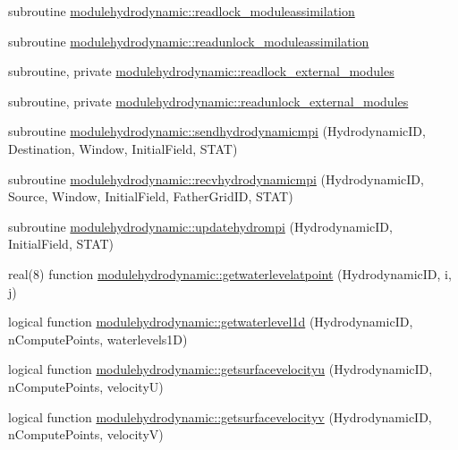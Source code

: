 \begin{DoxyCompactItemize}
\item 
subroutine \mbox{\hyperlink{namespacemodulehydrodynamic_ab5bfdd9c743fefaf135fd907892e5f17}{modulehydrodynamic\+::readlock\+\_\+moduleassimilation}}
\item 
subroutine \mbox{\hyperlink{namespacemodulehydrodynamic_a758de1858d333cb26621ded54ff8be04}{modulehydrodynamic\+::readunlock\+\_\+moduleassimilation}}
\item 
subroutine, private \mbox{\hyperlink{namespacemodulehydrodynamic_a52fe0c61446c7eca188bf5a42867951b}{modulehydrodynamic\+::readlock\+\_\+external\+\_\+modules}}
\item 
subroutine, private \mbox{\hyperlink{namespacemodulehydrodynamic_a6bb278dc4ab8e6429e5d7e752bd6347a}{modulehydrodynamic\+::readunlock\+\_\+external\+\_\+modules}}
\item 
subroutine \mbox{\hyperlink{namespacemodulehydrodynamic_a81c72f539c0330e132af0d9586b8a1b4}{modulehydrodynamic\+::sendhydrodynamicmpi}} (Hydrodynamic\+ID, Destination, Window, Initial\+Field, S\+T\+AT)
\item 
subroutine \mbox{\hyperlink{namespacemodulehydrodynamic_a7093ab7e0b48d35daf4c523567c57d5a}{modulehydrodynamic\+::recvhydrodynamicmpi}} (Hydrodynamic\+ID, Source, Window, Initial\+Field, Father\+Grid\+ID, S\+T\+AT)
\item 
subroutine \mbox{\hyperlink{namespacemodulehydrodynamic_a0b6a544e894ede118ad20bf00d80fa39}{modulehydrodynamic\+::updatehydrompi}} (Hydrodynamic\+ID, Initial\+Field, S\+T\+AT)
\item 
real(8) function \mbox{\hyperlink{namespacemodulehydrodynamic_aed5f042412115b2fc0605a45374090fc}{modulehydrodynamic\+::getwaterlevelatpoint}} (Hydrodynamic\+ID, i, j)
\item 
logical function \mbox{\hyperlink{namespacemodulehydrodynamic_a904ffc2601f0d353ef41686c0912a17d}{modulehydrodynamic\+::getwaterlevel1d}} (Hydrodynamic\+ID, n\+Compute\+Points, waterlevels1D)
\item 
logical function \mbox{\hyperlink{namespacemodulehydrodynamic_a9b4a77f72b7a93ea81baa40e63f809a2}{modulehydrodynamic\+::getsurfacevelocityu}} (Hydrodynamic\+ID, n\+Compute\+Points, velocityU)
\item 
logical function \mbox{\hyperlink{namespacemodulehydrodynamic_a7b33d38f90e3b125d5fe454fd30c25b9}{modulehydrodynamic\+::getsurfacevelocityv}} (Hydrodynamic\+ID, n\+Compute\+Points, velocityV)
\end{DoxyCompactItemize}
